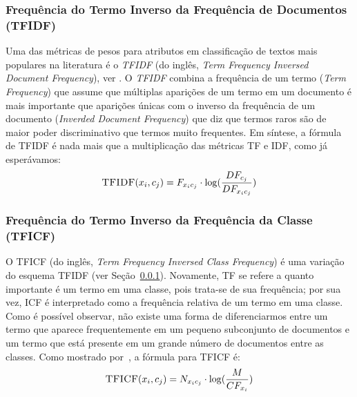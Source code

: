 \subsubsection{Frequência do Termo Inverso da Frequência de Documentos (TFIDF)}
\label{subsubsection::tfidf}

Uma das métricas de pesos para atributos em classificação de textos mais populares na literatura é o \textit{TFIDF} (do inglês, \textit{Term Frequency Inversed Document Frequency}), ver \cite{Salton88}. O \textit{TFIDF} combina a frequência de um termo (\textit{Term Frequency}) que assume que múltiplas aparições de um termo em um documento é mais importante que aparições únicas com o inverso da frequência de um documento (\textit{Inverded Document Frequency}) que diz que termos raros são de maior poder discriminativo que termos muito frequentes. Em síntese, a fórmula de TFIDF é nada mais que a multiplicação das métricas TF e IDF, como já esperávamos:
\begin{equation}\label{eqn::tficf}
 \textsc{TFIDF}(x_i, c_j) =  F_{x_ic_j} \cdot \log( \frac{DF_{c_j}}{ DF_{x_ic_j} } )
\end{equation}

\subsubsection{Frequência do Termo Inverso da Frequência da Classe (TFICF)}
\label{subsubsection::tficf}

O TFICF (do inglês, \textit{Term Frequency Inversed Class Frequency}) é uma variação do esquema TFIDF (ver Seção~\ref{subsubsection::tfidf}). Novamente, TF se refere a quanto importante é um termo em uma classe, pois trata-se de sua frequência; por sua vez, ICF é interpretado como a frequência relativa de um termo em uma classe. Como é possível observar, não existe uma forma de diferenciarmos entre um termo que aparece frequentemente em um pequeno subconjunto de documentos e um termo que está presente em um grande número de documentos entre as classes. Como mostrado por~\cite{ChihHow04}, a fórmula para TFICF é:
\begin{equation}\label{eqn::tficf}
 \textsc{TFICF}(x_i, c_j) = N_{x_ic_j} \cdot \log( \frac{M}{CF_{x_i}} )
\end{equation}


